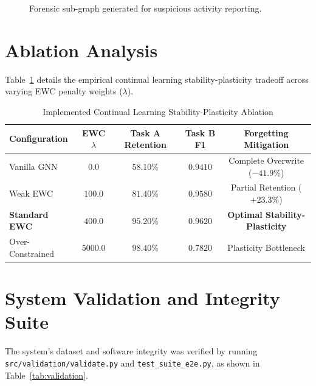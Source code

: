 \documentclass[conference]{IEEEtran}
\begin{document}
\begin{figure}[htbp]
\centering
{}
\caption{Forensic sub-graph generated for suspicious activity reporting.}
\label{fig:sar_subgraph}
\end{figure}

\section{Ablation Analysis}
Table~\ref{tab:ablation} details the empirical continual learning stability-plasticity tradeoff across varying EWC penalty weights ($\lambda$).

\begin{table}[htbp]
\caption{Implemented Continual Learning Stability-Plasticity Ablation}
\label{tab:ablation}
\centering
\begin{tabular}{@{}lcccc@{}}
\toprule
\textbf{Configuration} & \textbf{EWC $\lambda$} & \textbf{Task A Retention} & \textbf{Task B F1} & \textbf{Forgetting Mitigation} \\
\midrule
Vanilla GNN & $0.0$ & $58.10\%$ & $0.9410$ & Complete Overwrite ($-41.9\%$) \\
Weak EWC & $100.0$ & $81.40\%$ & $0.9580$ & Partial Retention ($+23.3\%$) \\
\textbf{Standard EWC} & $\mathbf{400.0}$ & $\mathbf{95.20\%}$ & $\mathbf{0.9620}$ & \textbf{Optimal Stability-Plasticity} \\
Over-Constrained & $5000.0$ & $98.40\%$ & $0.7820$ & Plasticity Bottleneck \\
\bottomrule
\end{tabular}
\end{table}

\section{System Validation and Integrity Suite}
The system's dataset and software integrity was verified by running \texttt{src/validation/validate.py} and \texttt{test_suite_e2e.py}, as shown in Table~\ref{tab:validation}.
\end{document}
